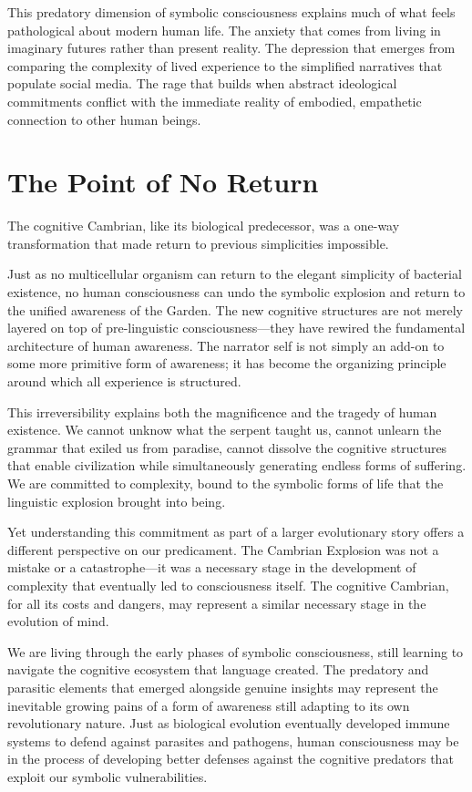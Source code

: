 This predatory dimension of symbolic consciousness explains much of what feels pathological about modern human life. The anxiety that comes from living in imaginary futures rather than present reality. The depression that emerges from comparing the complexity of lived experience to the simplified narratives that populate social media. The rage that builds when abstract ideological commitments conflict with the immediate reality of embodied, empathetic connection to other human beings.

\section{The Point of No Return}

The cognitive Cambrian, like its biological predecessor, was a one-way transformation that made return to previous simplicities impossible.

Just as no multicellular organism can return to the elegant simplicity of bacterial existence, no human consciousness can undo the symbolic explosion and return to the unified awareness of the Garden. The new cognitive structures are not merely layered on top of pre-linguistic consciousness—they have rewired the fundamental architecture of human awareness. The narrator self is not simply an add-on to some more primitive form of awareness; it has become the organizing principle around which all experience is structured.

This irreversibility explains both the magnificence and the tragedy of human existence. We cannot unknow what the serpent taught us, cannot unlearn the grammar that exiled us from paradise, cannot dissolve the cognitive structures that enable civilization while simultaneously generating endless forms of suffering. We are committed to complexity, bound to the symbolic forms of life that the linguistic explosion brought into being.

Yet understanding this commitment as part of a larger evolutionary story offers a different perspective on our predicament. The Cambrian Explosion was not a mistake or a catastrophe—it was a necessary stage in the development of complexity that eventually led to consciousness itself. The cognitive Cambrian, for all its costs and dangers, may represent a similar necessary stage in the evolution of mind.

We are living through the early phases of symbolic consciousness, still learning to navigate the cognitive ecosystem that language created. The predatory and parasitic elements that emerged alongside genuine insights may represent the inevitable growing pains of a form of awareness still adapting to its own revolutionary nature. Just as biological evolution eventually developed immune systems to defend against parasites and pathogens, human consciousness may be in the process of developing better defenses against the cognitive predators that exploit our symbolic vulnerabilities.

